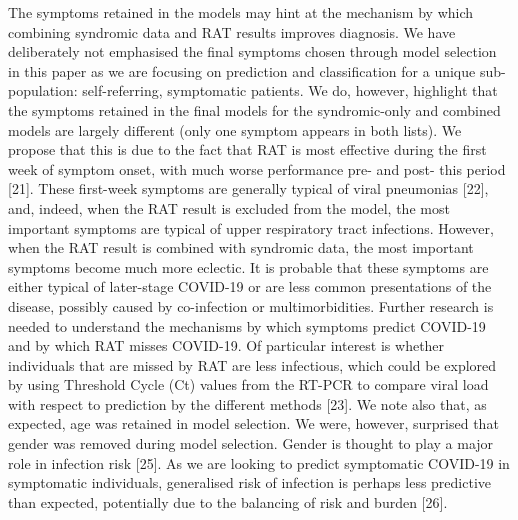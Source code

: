 \documentclass[]{elsarticle} %
\begin{document}
The symptoms retained in the models may hint at the mechanism by which
combining syndromic data and RAT results improves diagnosis. We have
deliberately not emphasised the final symptoms chosen through model
selection in this paper as we are focusing on prediction and
classification for a unique sub-population: self-referring, symptomatic
patients. We do, however, highlight that the symptoms retained in the
final models for the syndromic-only and combined models are largely
different (only one symptom appears in both lists). We propose that this
is due to the fact that RAT is most effective during the first week of
symptom onset, with much worse performance pre- and post- this period
{[}21{]}. These first-week symptoms are generally typical of viral
pneumonias {[}22{]}, and, indeed, when the RAT result is excluded from
the model, the most important symptoms are typical of upper respiratory
tract infections. However, when the RAT result is combined with
syndromic data, the most important symptoms become much more eclectic.
It is probable that these symptoms are either typical of later-stage
COVID-19 or are less common presentations of the disease, possibly
caused by co-infection or multimorbidities. Further research is needed
to understand the mechanisms by which symptoms predict COVID-19 and by
which RAT misses COVID-19. Of particular interest is whether individuals
that are missed by RAT are less infectious, which could be explored by
using Threshold Cycle (Ct) values from the RT-PCR to compare viral load
with respect to prediction by the different methods {[}23{]}. We note
also that, as expected, age was retained in model selection. We were,
however, surprised that gender was removed during model selection.
Gender is thought to play a major role in infection risk {[}25{]}. As we
are looking to predict symptomatic COVID-19 in symptomatic individuals,
generalised risk of infection is perhaps less predictive than expected,
potentially due to the balancing of risk and burden {[}26{]}.
\end{document}
